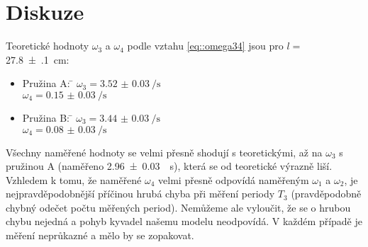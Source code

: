 \section*{Diskuze}
Teoretické hodnoty $\omega_3$ a $\omega_4$ podle vztahu \eqref{eq::omega34} jsou pro $l =$ \SI{27.8(1)}{cm}:
\begin{itemize}
\item \begin{tabbing} Pružina A: \= $\omega_3=\SI{3.52(3)}{\per\s}$	\\ \> $\omega_4=\SI{0.15(3)}{\per\s}$  \end{tabbing}
\item \begin{tabbing} Pružina B: \= $\omega_3=\SI{3.44(3)}{\per\s}$	\\ \> $\omega_4=\SI{0.08(3)}{\per\s}$  \end{tabbing}
\end{itemize}

Všechny naměřené hodnoty se velmi přesně shodují s teoretickými, až na $\omega_3$ s pružinou A (naměřeno \SI{2.96(3)}{\per\s}), která se od teoretické výrazně liší.
Vzhledem k tomu, že naměřené $\omega_4$ velmi přesně odpovídá naměřeným $\omega_1$ a $\omega_2$, je nejpravděpodobnější příčinou hrubá chyba při měření periody $T_3$ (pravděpodobně chybný odečet počtu měřených period).
Nemůžeme ale vyloučit, že se o hrubou chybu nejedná a pohyb kyvadel našemu modelu neodpovídá.
V každém případě je měření neprůkazné a mělo by se zopakovat.

